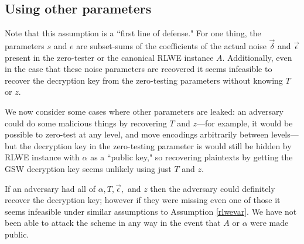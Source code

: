 \subsection{Using other parameters}
Note that this assumption is a ``first line of defense."  For one thing, the parameters $s$ and $e$ are subset-sums of the coefficients of the actual noise $\vec{\delta}$ and $\vec{\epsilon}$ present in the zero-tester or the canonical RLWE instance $A$. Additionally, even in the case that these noise parameters are recovered it seems infeasible to recover the decryption key from the zero-testing parameters without knowing $T$ or $z$.  

We now consider some cases where other parameters are leaked:  an adversary could do some malicious things by recovering $T$ and $z$---for example, it would be possible to zero-test at any level, and move encodings arbitrarily between levels---but the decryption key in the zero-testing parameter is would still be hidden by RLWE instance with $\alpha$ as a ``public key," so recovering plaintexts by getting the GSW decryption key seems unlikely using just $T$ and $z$.  

If an adversary had all of $\alpha, T, \vec{\epsilon},$ and $z$ then the adversary could definitely recover the decryption key; however if they were missing even one of those it seems infeasible under similar assumptions to Assumption \ref{rlwevar}.  We have not been able to attack the scheme in any way in the event that $A$ or $\alpha$ were made public.

